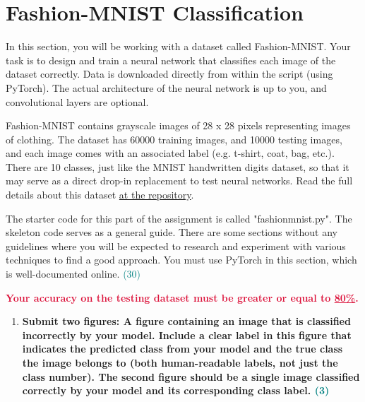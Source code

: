 \documentclass[a4paper]{article}
\begin{document}
\begin{sloppypar}
\begin{enumerate}[start=1,label=Q\arabic*,left=0pt]
    

    

\end{enumerate}

\section{Fashion-MNIST Classification}

\par In this section, you will be working with a dataset called Fashion-MNIST. Your task is to
design and train a neural network that classifies each image of the dataset correctly. Data
is downloaded directly from within the script (using PyTorch). The actual architecture of
the neural network is up to you, and convolutional layers are optional.

\vspace{\baselineskip}

\noindent Fashion-MNIST contains grayscale images of 28 x 28 pixels representing images of clothing. 
The dataset has 60000 training images, and 10000 testing images, and each image
comes with an associated label (e.g. t-shirt, coat, bag, etc.). There are 10 classes, just
like the MNIST handwritten digits dataset, so that it may serve as a direct drop-in replacement 
to test neural networks. Read the full details about this dataset \href{https://github.com/zalandoresearch/fashion-mnist}{at the repository}.

\vspace{\baselineskip}

\noindent The starter code for this part of the assignment is called "fashionmnist.py". The skeleton
code serves as a general guide. There are some sections without any guidelines where
you will be expected to research and experiment with various techniques to find a good
approach. You must use PyTorch in this section, which is well-documented online. \hfill \textcolor{teal}{(30)}

\vspace{\baselineskip}

\noindent \textbf{\textcolor{crimson}{Your accuracy on the testing dataset must be greater or equal to \underline{80\%}.}}

\vspace{\baselineskip}

\begin{enumerate}[start=4,label=Q\arabic*,left=0pt]
    \item \textbf{Submit two figures: A figure containing an image that is classified incorrectly by your
    model. Include a clear label in this figure that indicates the predicted class from your
    model and the true class the image belongs to (both human-readable labels, not just the
    class number). The second figure should be a single image classified correctly by your
    model and its corresponding class label. \hfill \textcolor{teal}{(3)}}


\end{enumerate}
\end{sloppypar}
\end{document}
